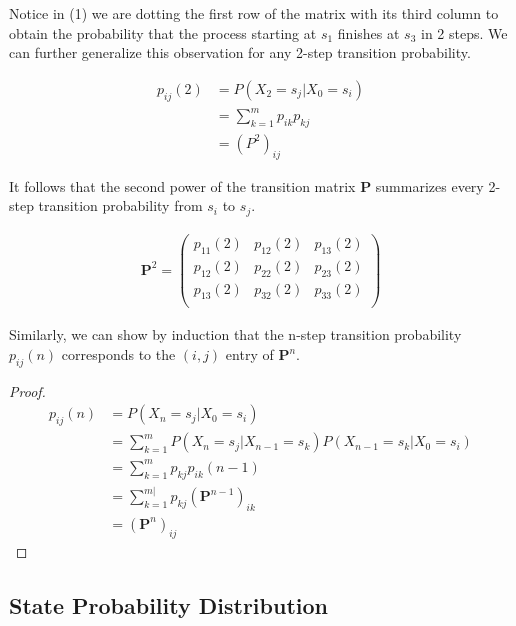 \documentclass[a4paper, 12pt]{article}
\begin{document}
	Notice in (1) we are dotting the first row of the matrix  with its third column to obtain the probability 
	that the process starting at $s_1$ finishes at $s_3$ in 2 steps. We can further generalize this observation for any 2-step 
	transition probability.

	\begin{equation*}
		\begin{aligned}
			p_{ij}(2) &= P(X_2 = s_j|X_0 = s_i) \\ 
					&= \sum_{k=1}^{m} p_{ik}p_{kj}\\
					&= (P^2)_{ij}
		\end{aligned}
	\end{equation*}	    

	It follows that the second power of the transition matrix \textbf{P} summarizes every 2-step transition probability 
	from $s_i$ to $s_j$.

	\begin{equation*}
		\begin{aligned}
			\mathbf{P}^2 =
			\begin{pmatrix}
				p_{11}(2) & p_{12}(2) & p_{13}(2) \\
				p_{12}(2) & p_{22}(2) & p_{23}(2) \\
				p_{13}(2) & p_{32}(2) & p_{33}(2) \\
			\end{pmatrix}
		\end{aligned}
	\end{equation*}

	Similarly, we can show by induction that the n-step transition probability $p_{ij}(n)$ corresponds to the $(i,j)$ entry 
	of $\mathbf{P}^n$. 
	\begin{proof}
	\begin{equation*}
		\begin{aligned}
			p_{ij}(n) &= P(X_n = s_j|X_0 = s_i) \\
					&= \sum_{k=1}^{m} P(X_n = s_j|X_{n-1} = s_k)P(X_{n-1} = s_k | X_0 = s_i) \\
					&= \sum_{k=1}^{m} p_{kj}p_{ik}(n-1) \\
					&= \sum_{k=1}^{m|} p_{kj}(\mathbf{P}^{n-1})_{ik} \\
					&= (\mathbf{P}^n)_{ij} 
		\end{aligned}
	\end{equation*}	
	\end{proof}
	
\subsection*{State Probability Distribution}
\end{document}
